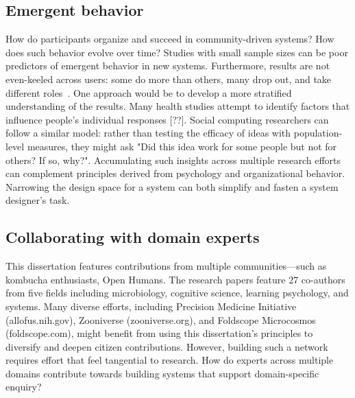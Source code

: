 \subsection{Emergent behavior}
How do participants organize and succeed in community-driven systems? How does such behavior evolve over time? Studies with small sample sizes can be poor predictors of emergent behavior in new systems. Furthermore, results are not even-keeled across users: some do more than others, many drop out, and take different roles~\cite{Bryant2005}. One approach would be to develop a more stratified understanding of the results. Many health studies attempt to identify factors that influence people's individual responses [??]. Social computing researchers can follow a similar model: rather than testing the efficacy of ideas with population-level measures, they might ask "Did this idea work for some people but not for others? If so, why?". Accumulating such insights across multiple research efforts can complement principles derived from psychology and organizational behavior. Narrowing the design space for a system can both simplify and fasten a system designer's task.


\subsection{Collaborating with domain experts}
This dissertation features contributions from multiple communities—such as kombucha enthusiasts, Open Humans. The research papers feature 27 co-authors from five fields including microbiology, cognitive science, learning psychology, and systems. Many diverse efforts, including Precision Medicine Initiative (allofus.nih.gov), Zooniverse (zooniverse.org), and Foldscope Microcosmos (foldscope.com), might benefit from using this dissertation’s principles to diversify and deepen citizen contributions. However, building such a network requires effort that feel tangential to research. How do experts across multiple domains contribute towards building systems that support domain-specific enquiry? 

